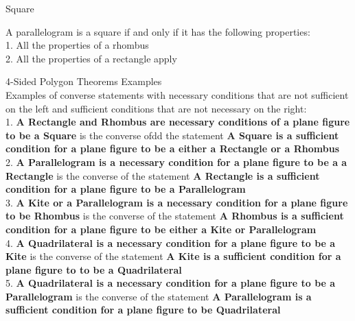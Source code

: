 \begin{tcolorbox}
\begin{definition}
Square

A parallelogram is a square if and only if it has the following properties: \\
1. All the properties of a rhombus \\
2. All the properties of a rectangle apply \\
\end{definition}
\end{tcolorbox}

\newpage
\begin{definition}
4-Sided Polygon Theorems Examples \\

Examples of converse statements with necessary conditions that are not sufficient on the left and sufficient conditions that are not necessary on the right: \\

1. {\bf A Rectangle and Rhombus are necessary conditions of a plane figure to be a Square} is the converse ofdd the statement {\bf A Square is a sufficient condition for a plane figure to be a either a Rectangle or a Rhombus} \\


2. {\bf A Parallelogram is a necessary condition for a plane figure to be a a Rectangle} is the converse of the statement {\bf A Rectangle is a sufficient condition for a plane figure to be a Parallelogram}\\

3. {\bf A Kite or a Parallelogram is a necessary condition for a plane figure to be Rhombus} is the converse of the statement {\bf A Rhombus is a sufficient condition for a plane figure to be either a Kite or Parallelogram}\\

4. {\bf A Quadrilateral is a necessary condition for a plane figure to be a Kite} is the converse of the statement {\bf A Kite is a sufficient condition for a plane figure to to be a Quadrilateral} \\

5. {\bf A Quadrilateral is a necessary condition for a plane figure to be a Parallelogram} is the converse of the statement {\bf A Parallelogram is a sufficient condition for a plane figure to be Quadrilateral} \\
\end{definition}

